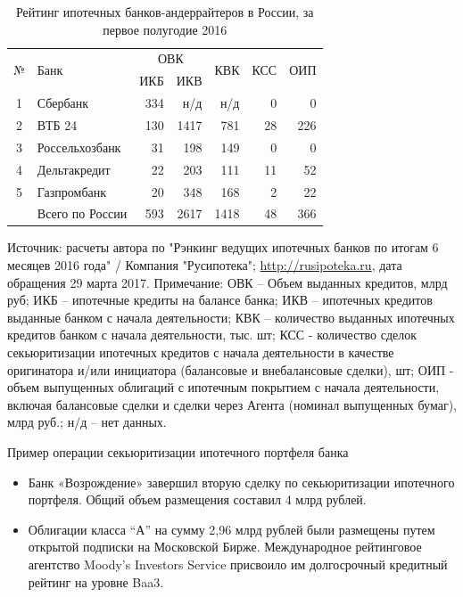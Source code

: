 \documentclass[_Banking_p2.tex]{subfiles}
\begin{document}
\begin{frame}[shrink=25]
\begin{table}[htbp]
  \centering
  \caption{Рейтинг ипотечных банков-андеррайтеров в России, за первое полугодие 2016}
    \begin{tabular}{clrrrrr}
    \toprule
    \multirow{2}[4]{*}{№}     & \multirow{2}[4]{*}{Банк}  & \multicolumn{2}{c}{ОВК} & \multirow{2}[4]{*}{КВК} & \multirow{2}[4]{*}{КСС}   & \multirow{2}[4]{*}{ОИП} \\\cmidrule(lr){3-4}
          &       & ИКБ   & ИКВ   &       &       &  \\
    \midrule
    1     &  Сбербанк & 334   & н/д   & н/д   & 0     & 0 \\
    2     &  ВТБ 24 & 130   & 1417  & 781   & 28    & 226 \\
    3     &  Россельхозбанк & 31    & 198   & 149   & 0     & 0 \\
    4     &  Дельтакредит & 22    & 203   & 111   & 11    & 52 \\
    5     &  Газпромбанк & 20    & 348   & 168   & 2     & 22 \\
    \midrule
          & Всего по России & 593   & 2617  & 1418  & 48    & 366 \\
    \bottomrule
    \end{tabular}%
  \label{tab:addlabel}%
\end{table}%
{\scriptsize
Источник: расчеты автора по "Рэнкинг ведущих ипотечных банков по итогам 6 месяцев 2016 года" / Компания "Русипотека"; \url{http://rusipoteka.ru}, дата обращения 29 марта 2017.
Примечание: ОВК – Объем выданных кредитов, млрд руб; ИКБ – ипотечные кредиты на балансе банка; ИКВ – ипотечных кредитов выданные банком с начала деятельности; КВК – количество выданных ипотечных кредитов банком с начала деятельности, тыс. шт; КСС - количество сделок секьюритизации ипотечных кредитов с начала деятельности в качестве оригинатора и/или инициатора (балансовые и внебалансовые сделки), шт; ОИП - объем выпущенных облигаций с ипотечным покрытием с начала деятельности, включая балансовые сделки и сделки через Агента (номинал выпущенных бумаг), млрд руб.; н/д – нет данных.
\par}
\end{frame}

\begin{frame}{Пример операции секьюритизации ипотечного портфеля банка}
\begin{itemize}[<+->]
\item
Банк «Возрождение» завершил вторую сделку по секьюритизации ипотечного портфеля. Общий объем размещения составил 4 млрд рублей. 
\item
Облигации класса ``А'' на сумму 2,96 млрд рублей были размещены путем открытой подписки на Московской Бирже. Международное рейтинговое агентство Moody’s Investors Service присвоило им долгосрочный кредитный рейтинг на уровне Baa3. 
\end{itemize}
\end{frame}
\end{document}
